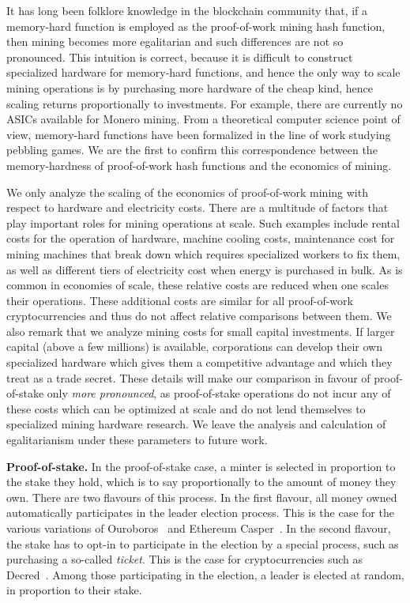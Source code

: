 It
has long been folklore knowledge in the blockchain community that, if a
memory-hard function is employed as the proof-of-work mining hash function, then
mining becomes more egalitarian and such differences are not so pronounced. This intuition is correct, because
it is difficult to construct specialized hardware for memory-hard functions, and
hence the only way to scale mining operations is by purchasing more hardware of
the cheap kind, hence scaling returns proportionally to investments. For
example, there are currently no ASICs available for Monero mining. From a theoretical computer
science point of view, memory-hard functions have been formalized in the line of
work studying pebbling games. We are the first to confirm this correspondence between the
memory-hardness of proof-of-work hash functions and the economics of mining.

\begin{remark}\label{rmk:pow-scale}
We only analyze the scaling of the economics of proof-of-work mining with
respect to hardware and electricity costs. There are a multitude of factors that
play important roles for mining operations at scale. Such examples include rental
costs for the operation of hardware, machine cooling costs, maintenance cost
for mining machines that break down which requires specialized workers to fix
them, as well as different tiers of electricity cost when energy is purchased in
bulk. As is common in economies of scale, these relative costs are reduced when
one scales their operations. These additional costs are similar for all
proof-of-work cryptocurrencies and thus do not affect relative comparisons
between them. We also remark that we analyze mining costs for small capital
investments. If larger capital (above a few millions) is available,
corporations can develop their own specialized hardware which
gives them a competitive advantage and which they treat as a trade secret.
These details will make our comparison in favour of proof-of-stake only
\emph{more pronounced}, as proof-of-stake operations do not incur any
of these costs which can be optimized at scale and do not lend themselves to
specialized mining hardware research. We leave the analysis and calculation
of egalitarianism under these parameters to future work.
\end{remark}

\noindent\textbf{Proof-of-stake.}
In the proof-of-stake case, a minter is selected in proportion to the stake they
hold, which is to say proportionally to the amount of money they own. There are
two flavours of this process. In the first flavour, all money owned automatically participates in the leader election
process. This is the case for the various variations of Ouroboros~\cite{ouroboros}
and Ethereum Casper~\cite{casper}. In the second flavour, the stake has to opt-in to participate in
the election by a special process, such as purchasing a so-called \emph{ticket}. This is the case for cryptocurrencies such as
Decred~\cite{decred}. Among those participating in the election, a leader is
elected at random, in proportion to their stake.

